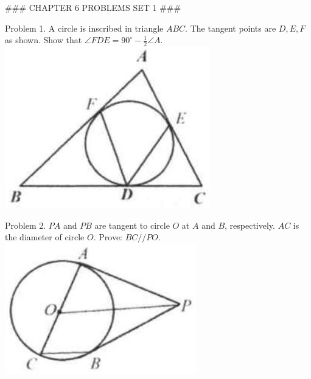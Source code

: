 \documentclass[10pt]{article}
\begin{document}
### CHAPTER 6 PROBLEMS SET 1 ###

Problem 1. A circle is inscribed in triangle \(A B C\). The tangent points are \(D, E, F\) as shown. Show that \(\angle F D E=90^{\circ}-\frac{1}{2} \angle A\).\\
\includegraphics[max width=\textwidth, center]{2025_04_17_97bc1f7e44d93c271a88g-154(1)}

Problem 2. \(P A\) and \(P B\) are tangent to circle \(O\) at \(A\) and \(B\), respectively. \(A C\) is the diameter of circle \(O\). Prove: \(B C / / P O\).\\
\includegraphics[max width=\textwidth, center]{2025_04_17_97bc1f7e44d93c271a88g-154(2)}
\end{document}
